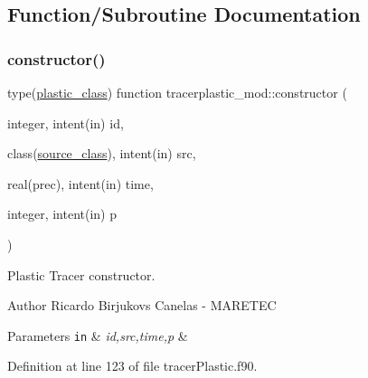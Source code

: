 \subsection{Function/\+Subroutine Documentation}
\mbox{\label{namespacetracerplastic__mod_ae68444b860b6e7abf3940b0ee1bfe57a}} 
\subsubsection{\texorpdfstring{constructor()}{constructor()}}
{\footnotesize\ttfamily type(\mbox{\hyperlink{structtracerplastic__mod_1_1plastic__class}{plastic\+\_\+class}}) function tracerplastic\+\_\+mod\+::constructor (\begin{DoxyParamCaption}\item[{integer, intent(in)}]{id,  }\item[{class(\mbox{\hyperlink{structsources__mod_1_1source__class}{source\+\_\+class}}), intent(in)}]{src,  }\item[{real(prec), intent(in)}]{time,  }\item[{integer, intent(in)}]{p }\end{DoxyParamCaption})\hspace{0.3cm}{\ttfamily [private]}}



Plastic Tracer constructor. 

\begin{DoxyAuthor}{Author}
Ricardo Birjukovs Canelas -\/ M\+A\+R\+E\+T\+EC 
\end{DoxyAuthor}

\begin{DoxyParams}[1]{Parameters}
\mbox{\tt in}  & {\em id,src,time,p} & \\
\hline
\end{DoxyParams}


Definition at line 123 of file tracer\+Plastic.\+f90.


